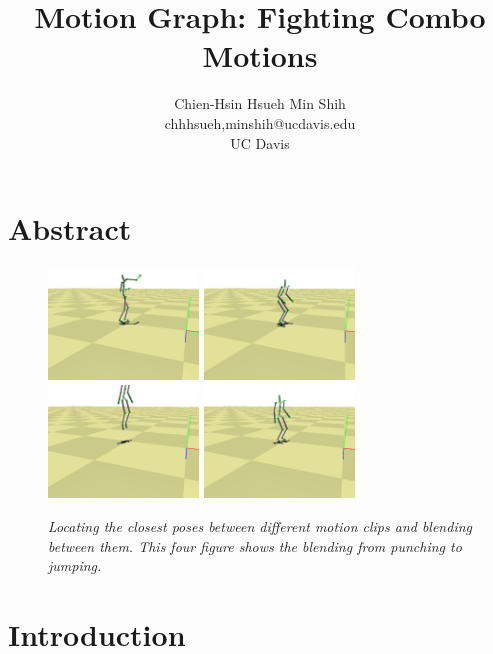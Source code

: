 \documentclass[twocolumn, 11pt]{article}  %
\newcommand*{\TitleFont}{%
      \usefont{\encodingdefault}{\rmdefault}{b}{n}%
      \fontsize{16}{20}%
      \selectfont}
\begin{document}

\title{\TitleFont Motion Graph: Fighting Combo Motions}
\author{Chien-Hsin Hsueh   Min Shih\\chhhsueh,minshih@ucdavis.edu\\UC Davis }
\maketitle

\section{Abstract}
\begin{figure}[t]
\includegraphics[width=40mm]{Images/ss1}
\includegraphics[width=40mm]{Images/ss2}
\includegraphics[width=40mm]{Images/ss3}
\includegraphics[width=40mm]{Images/ss4}
\caption{\textit{Locating the closest poses between different motion clips and blending between them. 
This four figure shows the blending from punching to jumping.}}
\label{blending_process}
\end{figure}



\section{Introduction}

\end{document}
